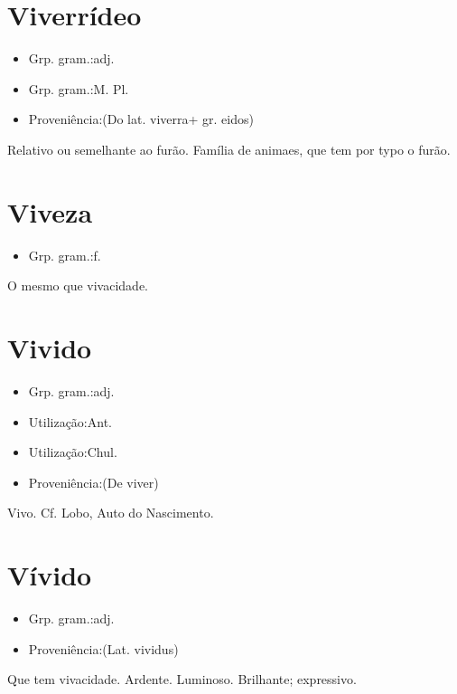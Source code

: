 \documentclass{article}
\begin{document}
\section{Viverrídeo}
\begin{itemize}
\item {Grp. gram.:adj.}
\end{itemize}
\begin{itemize}
\item {Grp. gram.:M. Pl.}
\end{itemize}
\begin{itemize}
\item {Proveniência:(Do lat. \textunderscore viverra\textunderscore  + gr. \textunderscore eidos\textunderscore )}
\end{itemize}
Relativo ou semelhante ao furão.
Família de animaes, que tem por typo o furão.
\section{Viveza}
\begin{itemize}
\item {Grp. gram.:f.}
\end{itemize}
O mesmo que \textunderscore vivacidade\textunderscore .
\section{Vivido}
\begin{itemize}
\item {Grp. gram.:adj.}
\end{itemize}
\begin{itemize}
\item {Utilização:Ant.}
\end{itemize}
\begin{itemize}
\item {Utilização:Chul.}
\end{itemize}
\begin{itemize}
\item {Proveniência:(De \textunderscore viver\textunderscore )}
\end{itemize}
Vivo. Cf. Lobo, \textunderscore Auto do Nascimento\textunderscore .
\section{Vívido}
\begin{itemize}
\item {Grp. gram.:adj.}
\end{itemize}
\begin{itemize}
\item {Proveniência:(Lat. \textunderscore vividus\textunderscore )}
\end{itemize}
Que tem vivacidade.
Ardente.
Luminoso.
Brilhante; expressivo.
\end{document}
